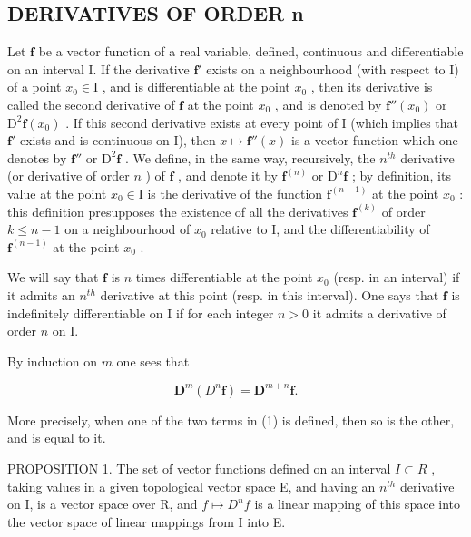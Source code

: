 \subsection{DERIVATIVES OF ORDER n}

Let \(\mathbf{f}\) be a vector function of a real variable, defined, continuous and differentiable on an interval I. If the derivative \(\mathbf{f}'\) exists on a neighbourhood (with respect to I) of a point \(x_0 \in \mathrm{I}\) , and is differentiable at the point \(x_0\) , then its derivative is called the second derivative of \(\mathbf{f}\) at the point \(x_0\) , and is denoted by \(\mathbf{f}''(x_0)\) or \(\mathrm{D}^2\mathbf{f}(x_0)\) . If this second derivative exists at every point of I (which implies that \(\mathbf{f}'\) exists and is continuous on I), then \(x \mapsto \mathbf{f}''(x)\) is a vector function which one denotes by \(\mathbf{f}''\) or \(\mathrm{D}^2\mathbf{f}\) . We define, in the same way, recursively, the \(n^{th}\) derivative (or derivative of order \(n\) ) of \(\mathbf{f}\) , and denote it by \(\mathbf{f}^{(n)}\) or \(\mathrm{D}^n\mathbf{f}\) ; by definition, its value at the point \(x_0 \in \mathrm{I}\) is the derivative of the function \(\mathbf{f}^{(n-1)}\) at the point \(x_0\) : this definition presupposes the existence of all the derivatives \(\mathbf{f}^{(k)}\) of order \(k \leqslant n - 1\) on a neighbourhood of \(x_0\) relative to I, and the differentiability of \(\mathbf{f}^{(n-1)}\) at the point \(x_0\) .

We will say that \(\mathbf{f}\) is \(n\) times differentiable at the point \(x_0\) (resp. in an interval) if it admits an \(n^{th}\) derivative at this point (resp. in this interval). One says that \(\mathbf{f}\) is indefinitely differentiable on I if for each integer \(n > 0\) it admits a derivative of order \(n\) on I.

By induction on \(m\) one sees that

\[
\mathbf {D} ^ {m} (D ^ {n} \mathbf {f}) = \mathbf {D} ^ {m + n} \mathbf {f}.\tag{1}
\]

More precisely, when one of the two terms in (1) is defined, then so is the other, and is equal to it.

PROPOSITION 1. The set of vector functions defined on an interval \(I \subset R\) , taking values in a given topological vector space E, and having an \(n^{th}\) derivative on I, is a vector space over R, and \(f \mapsto D^{n}f\) is a linear mapping of this space into the vector space of linear mappings from I into E.


